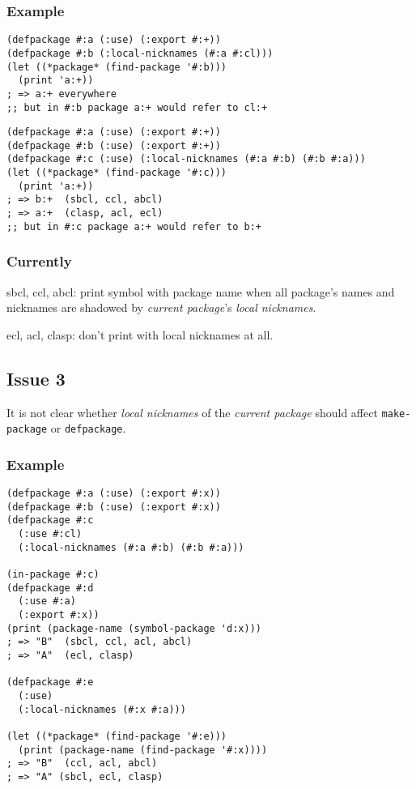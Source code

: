 \documentclass[11pt]{article}
\begin{document}
\subsubsection{Example}
\label{sec:org0ed1ee9}
\begin{verbatim}
(defpackage #:a (:use) (:export #:+))
(defpackage #:b (:local-nicknames (#:a #:cl)))
(let ((*package* (find-package '#:b)))
  (print 'a:+))
; => a:+ everywhere
;; but in #:b package a:+ would refer to cl:+
\end{verbatim}
\begin{verbatim}
(defpackage #:a (:use) (:export #:+))
(defpackage #:b (:use) (:export #:+))
(defpackage #:c (:use) (:local-nicknames (#:a #:b) (#:b #:a)))
(let ((*package* (find-package '#:c)))
  (print 'a:+))
; => b:+  (sbcl, ccl, abcl)
; => a:+  (clasp, acl, ecl)
;; but in #:c package a:+ would refer to b:+
\end{verbatim}
\subsubsection{Currently}
\label{sec:orga2dc728}
sbcl, ccl, abcl: print symbol with package name when all package's names
and nicknames are shadowed by \emph{current package}'s \emph{local nicknames}.

ecl, acl, clasp: don't print with local nicknames at all.
\subsection{Issue 3}
\label{sec:org4ae7c79}
It is not clear whether \emph{local nicknames} of the \emph{current package} should
affect \texttt{make-package} or \texttt{defpackage}.
\subsubsection{Example}
\label{sec:org2dc6296}
\begin{verbatim}
(defpackage #:a (:use) (:export #:x))
(defpackage #:b (:use) (:export #:x))
(defpackage #:c
  (:use #:cl)
  (:local-nicknames (#:a #:b) (#:b #:a)))

(in-package #:c)
(defpackage #:d
  (:use #:a)
  (:export #:x))
(print (package-name (symbol-package 'd:x)))
; => "B"  (sbcl, ccl, acl, abcl)
; => "A"  (ecl, clasp)

(defpackage #:e
  (:use)
  (:local-nicknames (#:x #:a)))

(let ((*package* (find-package '#:e)))
  (print (package-name (find-package '#:x))))
; => "B"  (ccl, acl, abcl)
; => "A" (sbcl, ecl, clasp)
\end{verbatim}
\end{document}
